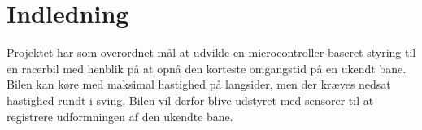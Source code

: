 \section{Indledning}

Projektet har som overordnet mål at udvikle en microcontroller-baseret styring til en racerbil med henblik på at opnå den korteste omgangstid på en ukendt bane. Bilen kan køre med maksimal hastighed på langsider, men der kræves nedsat hastighed rundt i sving. Bilen vil derfor blive udstyret med sensorer til at registrere udformningen af den ukendte bane.


\newpage
